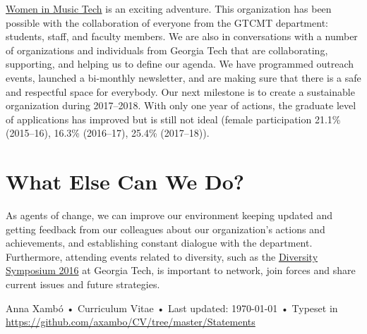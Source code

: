 \documentclass[10pt, a4paper]{article}
\begin{document}
\href{http://www.gtcmt.gatech.edu/womeninmusictech}{Women in Music Tech} is an exciting adventure. This organization has been possible with the collaboration of everyone from the GTCMT department: students, staff, and faculty members. We are also in conversations with a number of organizations and individuals from Georgia Tech that are collaborating, supporting, and helping us to define our agenda. We have programmed outreach events, launched a bi-monthly newsletter, and are making sure that there is a safe and respectful space for everybody. Our next milestone is to create a sustainable organization during 2017--2018. With only one year of actions, the graduate level of applications has improved but is still not ideal (female participation 21.1\% (2015--16), 16.3\% (2016--17), 25.4\% (2017--18)).

\section*{What Else Can We Do?}

As agents of change, we can improve our environment keeping updated and getting feedback from our colleagues about our organization's actions and achievements, and establishing constant dialogue with the department. Furthermore, attending events related to diversity, such as the \href{http://www.diversity.gatech.edu/diversitysymposium}{Diversity Symposium 2016} at Georgia Tech, is important to network, join forces and share current issues and future strategies.

\vfill{}

\begin{center}
{\scriptsize  Anna Xambó •\- Curriculum Vitae •\- Last updated: \today\- •\- %
Typeset in \href{http://nitens.org/taraborelli/cvtex}{
\XeTeX }\\
\href{https://github.com/axambo/CV/tree/master/Statements}{https://github.com/axambo/CV/tree/master/Statements}}
\end{center}
\end{document}
